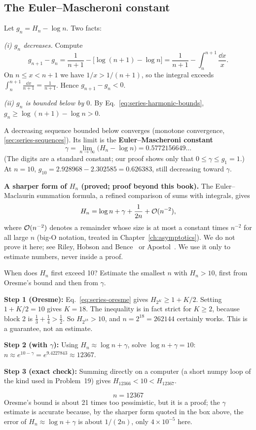 \subsection{The Euler--Mascheroni constant}

Let $g_n=H_n-\log n$. Two facts:

\emph{(i) $g_n$ decreases.} Compute
\[
g_{n+1}-g_n=\frac1{n+1}-\bigl[\log(n+1)-\log n\bigr]=\frac1{n+1}-\int_n^{n+1}\frac{\dd x}{x}.
\]
On $n\le x<n+1$ we have $1/x>1/(n+1)$, so the integral exceeds $\int_n^{n+1}\frac{\dd x}{n+1}=\frac1{n+1}$. Hence $g_{n+1}-g_n<0$.

\emph{(ii) $g_n$ is bounded below by $0$.} By Eq.~\eqref{eq:series-harmonic-bounds}, $g_n\ge\log(n+1)-\log n>0$.

A decreasing sequence bounded below converges (monotone convergence, \cref{sec:series-sequences}). Its limit is the \textbf{Euler--Mascheroni constant}
\begin{equation}
\gamma=\lim_{n\to\infty}\bigl(H_n-\log n\bigr)=0.5772156649\ldots
\label{eq:series-gamma}
\end{equation}
(The digits are a standard constant; our proof shows only that $0\le\gamma\le g_1=1$.) At $n=10$, $g_{10}=2.928968-2.302585=0.626383$, still decreasing toward $\gamma$.

\begin{beyond}
\textbf{A sharper form of $H_n$ (proved; proof beyond this book).} The Euler--Maclaurin summation formula, a refined comparison of sums with integrals, gives
\[
H_n=\log n+\gamma+\frac1{2n}+\mathcal{O}(n^{-2}),
\]
where $\mathcal{O}(n^{-2})$ denotes a remainder whose size is at most a constant times $n^{-2}$ for all large $n$ (big-O notation, treated in Chapter~\ref{ch:asymptotics}). We do not prove it here; see Riley, Hobson and Bence~\cite{rhb} or Apostol~\cite{apostol}. We use it only to estimate numbers, never inside a proof.
\end{beyond}

\begin{sample}{When does $H_n$ first exceed 10?}
Estimate the smallest $n$ with $H_n>10$, first from Oresme's bound and then from $\gamma$.

\textbf{Step 1 (Oresme):} Eq.~\eqref{eq:series-oresme} gives $H_{2^K}\ge1+K/2$. Setting $1+K/2=10$ gives $K=18$. The inequality is in fact strict for $K\ge2$, because block 2 is $\tfrac13+\tfrac14>\tfrac12$. So $H_{2^{18}}>10$, and $n=2^{18}=262144$ certainly works. This is a guarantee, not an estimate.

\textbf{Step 2 (with $\gamma$):} Using $H_n\approx\log n+\gamma$, solve $\log n+\gamma=10$: $n\approx e^{10-\gamma}=e^{9.4227843}\approx12367$.

\textbf{Step 3 (exact check):} Summing directly on a computer (a short numpy loop of the kind used in Problem~19) gives $H_{12366}<10<H_{12367}$.

\[\boxed{n=12367}\]
Oresme's bound is about 21 times too pessimistic, but it is a proof; the $\gamma$ estimate is accurate because, by the sharper form quoted in the box above, the error of $H_n\approx\log n+\gamma$ is about $1/(2n)$, only $4\times10^{-5}$ here.
\end{sample}

